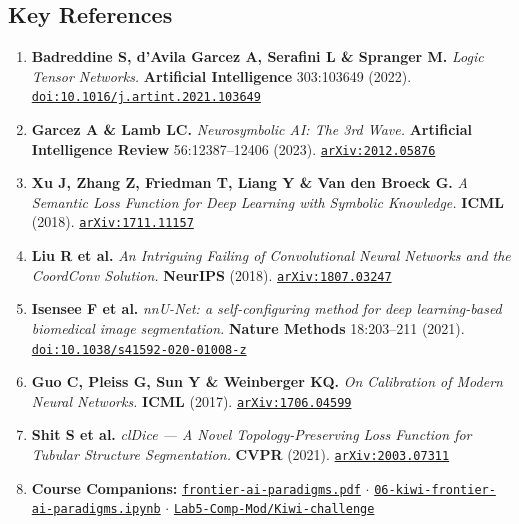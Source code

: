 \documentclass[10pt,a4paper]{article}
\newcommand{\ghblob}{https://github.com/arvidl/BMED365-2027/blob/main}
\begin{document}
\subsection*{Key References}
{\footnotesize
\begin{enumerate}[itemsep=1.5pt, topsep=2pt]
    \item \textbf{Badreddine S, d'Avila Garcez A, Serafini L \& Spranger M.} \textit{Logic Tensor Networks.} \textbf{Artificial Intelligence} 303:103649 (2022). \href{https://doi.org/10.1016/j.artint.2021.103649}{\texttt{doi:10.1016/j.artint.2021.103649}}
    \item \textbf{Garcez A \& Lamb LC.} \textit{Neurosymbolic AI: The 3rd Wave.} \textbf{Artificial Intelligence Review} 56:12387--12406 (2023). \href{https://arxiv.org/abs/2012.05876}{\texttt{arXiv:2012.05876}}
    \item \textbf{Xu J, Zhang Z, Friedman T, Liang Y \& Van den Broeck G.} \textit{A Semantic Loss Function for Deep Learning with Symbolic Knowledge.} \textbf{ICML} (2018). \href{https://arxiv.org/abs/1711.11157}{\texttt{arXiv:1711.11157}}
    \item \textbf{Liu R et al.} \textit{An Intriguing Failing of Convolutional Neural Networks and the CoordConv Solution.} \textbf{NeurIPS} (2018). \href{https://arxiv.org/abs/1807.03247}{\texttt{arXiv:1807.03247}}
    \item \textbf{Isensee F et al.} \textit{nnU-Net: a self-configuring method for deep learning-based biomedical image segmentation.} \textbf{Nature Methods} 18:203--211 (2021). \href{https://doi.org/10.1038/s41592-020-01008-z}{\texttt{doi:10.1038/s41592-020-01008-z}}
    \item \textbf{Guo C, Pleiss G, Sun Y \& Weinberger KQ.} \textit{On Calibration of Modern Neural Networks.} \textbf{ICML} (2017). \href{https://arxiv.org/abs/1706.04599}{\texttt{arXiv:1706.04599}}
    \item \textbf{Shit S et al.} \textit{clDice --- A Novel Topology-Preserving Loss Function for Tubular Structure Segmentation.} \textbf{CVPR} (2021). \href{https://arxiv.org/abs/2003.07311}{\texttt{arXiv:2003.07311}}
    \item \textbf{Course Companions:} \href{\ghblob/Lab4-Comp-Imag/Kiwi-challenge/docs/frontier-ai-paradigms.pdf}{\texttt{frontier-ai-paradigms.pdf}} $\cdot$ \href{\ghblob/Lab4-Comp-Imag/Kiwi-challenge/notebooks/06-kiwi-frontier-ai-paradigms.ipynb}{\texttt{06-kiwi-frontier-ai-paradigms.ipynb}} $\cdot$ \href{\ghblob/Lab5-Comp-Mod/Kiwi-challenge/README.md}{\texttt{Lab5-Comp-Mod/Kiwi-challenge}}
\end{enumerate}
}
\end{document}
